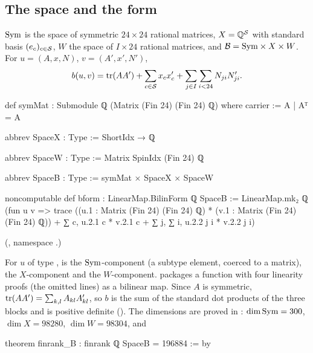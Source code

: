 \subsection{The space and the form}

\begin{definition}\label{ch21:def:spaceB}
$\mathrm{Sym}$ is the space of symmetric $24\times24$ rational matrices, $X={\mathbb{Q}}^{\mathcal{S}}$ with standard basis
$(e_c)_{c\in\mathcal{S}}$, $W$ the space of $I\times24$ rational matrices, and
$\mathcal{B}=\mathrm{Sym}\times X\times W$.  For $u=(A,x,N)$, $v=(A',x',N')$,
\begin{equation*}
  b(u,v)=\operatorname{tr}(AA')+\sum_{c\in\mathcal{S}}x_cx'_c+\sum_{j\in I}\sum_{i<24}N_{ji}N'_{ji}.
\end{equation*}
\end{definition}
\begin{leancode}
def symMat : Submodule ℚ (Matrix (Fin 24) (Fin 24) ℚ) where
  carrier := {A | Aᵀ = A}
\end{leancode}
\begin{leancode}
abbrev SpaceX : Type := ShortIdx → ℚ

abbrev SpaceW : Type := Matrix SpinIdx (Fin 24) ℚ

abbrev SpaceB : Type := symMat × SpaceX × SpaceW
\end{leancode}
\begin{leancode}
noncomputable def bform : LinearMap.BilinForm ℚ SpaceB :=
  LinearMap.mk₂ ℚ (fun u v => trace ((u.1 : Matrix (Fin 24) (Fin 24) ℚ) *
      (v.1 : Matrix (Fin 24) (Fin 24) ℚ)) +
      ∑ c, u.2.1 c * v.2.1 c + ∑ j, ∑ i, u.2.2 j i * v.2.2 j i)
\end{leancode}
(, namespace
.)
\begin{dictionary}
For $u$ of type ,  is the $\mathrm{Sym}$-component (a subtype element, coerced to a
matrix),  the $X$-component and  the $W$-component.  
packages a function with four linearity proofs (the omitted lines) as a bilinear map.  Since $A$ is
symmetric, $\operatorname{tr}(AA')=\sum_{k,l}A_{kl}A'_{kl}$, so $b$ is the sum of the standard dot products of the
three blocks and is positive definite ().  The dimensions are proved in
: $\dim\mathrm{Sym}=300$, $\dim X=98280$, $\dim W=98304$, and
\end{dictionary}
\begin{leancode}
theorem finrank_B : finrank ℚ SpaceB = 196884 := by
\end{leancode}
